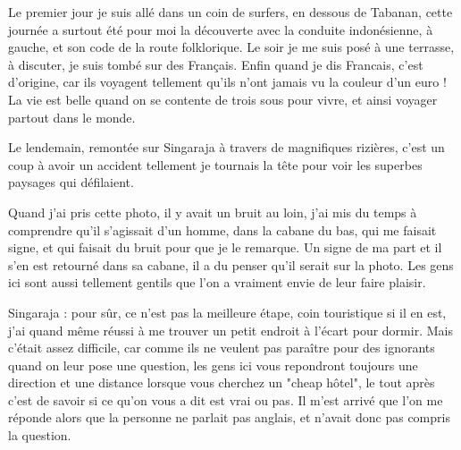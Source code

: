 \begin{multicols}{2}
Le premier jour je suis allé dans un coin de surfers, en dessous de Tabanan, cette journée a surtout été pour moi la découverte avec la conduite indonésienne, à gauche, et son code de la route folklorique. Le soir je me suis posé à une terrasse, à discuter, je suis tombé sur des Français. Enfin quand je dis Francais, c'est d'origine, car ils voyagent tellement qu'ils n'ont jamais vu la couleur d'un euro ! La vie est belle quand on se contente de trois sous pour vivre, et ainsi voyager partout dans le monde.

Le lendemain, remontée sur Singaraja à travers de magnifiques rizières, c'est un coup à avoir un accident tellement je tournais la tête pour voir les superbes paysages qui défilaient.








Quand j'ai pris cette photo, il y avait un bruit au loin, j'ai mis du temps à comprendre qu'il s'agissait d'un homme, dans la cabane du bas, qui me faisait signe, et qui faisait du bruit pour que je le remarque. Un signe de ma part et il s'en est retourné dans sa cabane, il a du penser qu'il serait sur la photo. Les gens ici sont aussi tellement gentils que l'on a vraiment envie de leur faire plaisir.

Singaraja : pour sûr, ce n'est pas la meilleure étape, coin touristique si il en est, j'ai quand même réussi à me trouver un petit endroit à l'écart pour dormir. Mais c'était assez difficile, car comme ils ne veulent pas paraître pour des ignorants quand on leur pose une question, les gens ici vous repondront toujours une direction et une distance lorsque vous cherchez un "cheap hôtel", le tout après c'est de savoir si ce qu'on vous a dit est vrai ou pas. Il m'est arrivé que l'on me réponde alors que la personne ne parlait pas anglais, et n'avait donc pas compris la question.


\end{multicols}
